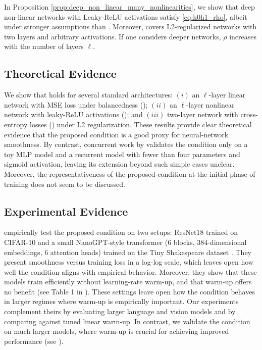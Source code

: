 \documentclass[a4paper,11pt]{article}
\newcommand{\1}{\mathbbm{1}}
\theoremstyle{plain}
\begin{document}
In Proposition \ref{prop:deep_non_linear_many_nonlinearities}, we show that deep non-linear networks with Leaky-ReLU activations satisfy \eqref{eq:h0h1_rho}, albeit under stronger assumptions than . Moreover,  covers L2-regularized networks with two layers and arbitrary activations. If one considers deeper networks, $\rho$ increases with the number of layers $\ell$.

\subsection{Theoretical Evidence}

We show that  holds for several standard architectures: $(i)$ an $\ell$-layer linear network with MSE loss under balancedness (); $(ii)$ an $\ell$-layer nonlinear network with leaky-ReLU activations (); and $(iii)$ two-layer network with cross-entropy losses () under L2 regularization. These results provide clear theoretical evidence that the proposed condition is a good proxy for neural-network smoothness. By contrast, concurrent work by \citet{liu2025theoretical} validates the condition only on a toy MLP model and a recurrent model with fewer than four parameters and sigmoid activation, leaving its extension beyond such simple cases unclear. Moreover, the representativeness of the proposed condition at the initial phase of training does not seem to be discussed.

\subsection{Experimental Evidence}

\citet{liu2025theoretical} empirically test the proposed condition on two setups: ResNet18 trained on CIFAR-10 \citep{krizhevsky2009learning} and a small NanoGPT-style transformer (6 blocks, 384-dimensional embeddings, 6 attention heads) trained on the Tiny Shakespeare dataset \citep{karpathy2015tinyshakspeare}. They present smoothness versus training loss in a log-log scale, which leaves open how well the condition aligns with empirical behavior. Moreover, they show that these models train efficiently without learning-rate warm-up, and that warm-up offers no benefit (see Table 1 in \citet{liu2025theoretical}). These settings leave open how the condition behaves in larger regimes where warm-up is empirically important. Our experiments complement theirs by evaluating larger language and vision models and by comparing against tuned linear warm-up. In contrast, we validate the condition on much larger models, where warm-up is crucial for achieving improved performance (see ).
\end{document}
